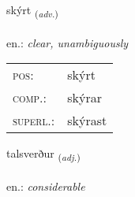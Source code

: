 \documentclass[frontgrid, backgrid]{flacards}\usepackage[]{graphicx}\usepackage[]{xcolor}
\begin{document}
\renewcommand{\flhead}{\vskip5pt \fboxsep=0pt {\small\bfseries\footnotesize Atviksorð | Adverb}}
\renewcommand{\fcfoot}{\vskip5pt \fboxsep=0pt \hspace{2pt}{\small\bfseries\footnotesize 2K}}

\renewcommand{\blhead}{\vskip5pt {\small\bfseries\footnotesize Atviksorð | Adverb }}
\renewcommand{\bcfoot}{\vskip5pt \hspace{2pt}{\small\bfseries\footnotesize 2K}}


{skýrt \small{\textsubscript{(\textit{adv.})}} \\[1ex] %
\textphonetic{[scir̥t]} \\
en.: \emph{clear, unambiguously} \\  [2ex]
\renewcommand*{\arraystretch}{0.8}
\begin{tabular}{ll}
\textsc{pos}: & skýrt \\ 
\textsc{comp.}: & skýrar \\ 
\textsc{superl.}: & skýrast \\
\end{tabular}
}

\renewcommand{\flhead}{\vskip5pt \fboxsep=0pt {\small\bfseries\footnotesize Lýsingarorð | Adjective}}
\renewcommand{\fcfoot}{\vskip5pt \fboxsep=0pt \hspace{2pt}{\small\bfseries\footnotesize 2K}}

\renewcommand{\blhead}{\vskip5pt {\small\bfseries\footnotesize Lýsingarorð | Adjective }}
\renewcommand{\bcfoot}{\vskip5pt \hspace{2pt}{\small\bfseries\footnotesize 2K}}


{talsverður \small{\textsubscript{(\textit{adj.})}} \\[1ex] %
\textphonetic{[tʰalsvɛrðʏr]} \\
en.: \emph{considerable} \\  [2ex]
\renewcommand*{\arraystretch}{0.8}
}
\end{document}
